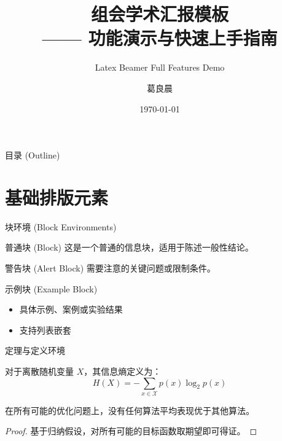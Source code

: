 \documentclass[aspectratio=169, 10pt, UTF8]{ctexbeamer}
\title[组会汇报模板]{组会学术汇报模板 \\[4pt] {\normalsize\color{darkGray} —— 功能演示与快速上手指南}}
\subtitle{Latex Beamer Full Features Demo}
\author[葛良晨]{葛良晨}
\institute[GLC Lab]{某某大学 · 某实验室}
\date{\today}
\begin{document}
\begin{frame}
  \titlepage
\end{frame}

\begin{frame}{目录 (Outline)}
  \tableofcontents
\end{frame}

\section{基础排版元素}

\begin{frame}{块环境 (Block Environments)}
  \begin{block}{普通块 (Block)}
    这是一个普通的信息块，适用于陈述一般性结论。
  \end{block}

  \begin{alertblock}{警告块 (Alert Block)}
    需要注意的关键问题或限制条件。
  \end{alertblock}

  \begin{exampleblock}{示例块 (Example Block)}
    \begin{itemize}
      \item 具体示例、案例或实验结果
      \item 支持列表嵌套
    \end{itemize}
  \end{exampleblock}
\end{frame}

\begin{frame}{定理与定义环境}
  \begin{definition}[信息熵]
    对于离散随机变量 $X$，其信息熵定义为：
    \[
      H(X) = -\sum_{x \in \mathcal{X}} p(x) \log_2 p(x)
    \]
  \end{definition}

  \begin{theorem}
    在所有可能的优化问题上，没有任何算法平均表现优于其他算法。
  \end{theorem}

  \begin{proof}
    基于归纳假设，对所有可能的目标函数取期望即可得证。
  \end{proof}
\end{frame}
\end{document}
